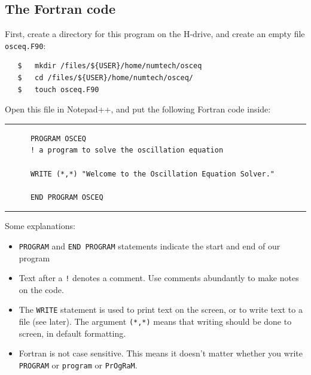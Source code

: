 \documentclass[a4paper]{article}
\begin{document}
\subsection{The Fortran code}
%
\par
First, create a directory for this program on the H-drive, and create an empty file \texttt{osceq.F90}:
%
\begin{verbatim}
   $   mkdir /files/${USER}/home/numtech/osceq
   $   cd /files/${USER}/home/numtech/osceq/
   $   touch osceq.F90
\end{verbatim}
%
\par
Open this file in {Notepad++}, and put the following Fortran code inside:
%
{\vspace{10pt}\hrule\small\vspace*{-2pt}\begin{verbatim}
	  PROGRAM OSCEQ
	  ! a program to solve the oscillation equation
	  
	  WRITE (*,*) "Welcome to the Oscillation Equation Solver."
	  
	  END PROGRAM OSCEQ
\end{verbatim}\hrule\vspace{5pt}}
%
Some explanations:
%
\begin{itemize}
	\item \verb+PROGRAM+ and \verb+END PROGRAM+ statements indicate the start and end of our program
	\item Text after a \verb+!+ denotes a comment. Use comments abundantly to make notes on the code.
	\item The \verb+WRITE+ statement is used to print text on the screen, or to write text to a file (see later). The argument \verb+(*,*)+ means that writing should be done to screen, in default formatting.
	\item Fortran is not case sensitive. This means it doesn't matter whether you write \verb+PROGRAM+ or \verb+program+ or \verb+PrOgRaM+.
\end{itemize}
%
\end{document}
